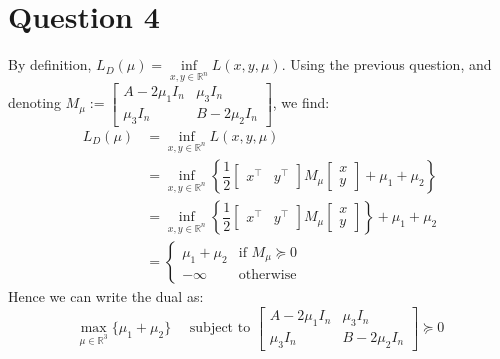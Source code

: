 \documentclass{article}
\newcommand{\R}{\mathbb{R}}
\newcommand{\tp}{^\top}
\begin{document}
\section*{Question 4}
By definition, $L_D(\mu)=\inf\limits_{x,y\in\R^n} L(x,y,\mu)$. Using the previous question, and denoting $M_\mu:=\begin{bmatrix} A-2\mu_1 I_n & \mu_3 I_n \\
\mu_3 I_n & B-2\mu_2 I_n \end{bmatrix}$, we find:
\begin{align*}
L_D(\mu)&=\inf\limits_{x,y\in\R^n} L(x,y,\mu) \\
&=\inf\limits_{x,y\in\R^n} \left\lbrace \dfrac{1}{2} \begin{bmatrix} x\tp & y\tp\end{bmatrix}M_\mu\begin{bmatrix} x \\ y \end{bmatrix} +\mu_1+\mu_2 \right\rbrace \\
&=\inf\limits_{x,y\in\R^n} \left\lbrace \dfrac{1}{2} \begin{bmatrix} x\tp & y\tp\end{bmatrix}M_\mu\begin{bmatrix} x \\ y \end{bmatrix} \right\rbrace+\mu_1+\mu_2   \\
&=\begin{cases} \mu_1+\mu_2 &\text{if }M_\mu\succeq 0 \\ -\infty &\text{otherwise} \end{cases}
\end{align*}
Hence we can write the dual as:
\begin{equation*}\tag{D} \label{D}
\max_{\mu\in\R^3} \{\mu_1+\mu_2\} \quad \text{ subject to } \begin{bmatrix} A-2\mu_1 I_n & \mu_3 I_n \\
\mu_3 I_n & B-2\mu_2 I_n \end{bmatrix} \succeq 0
\end{equation*}
\end{document}

